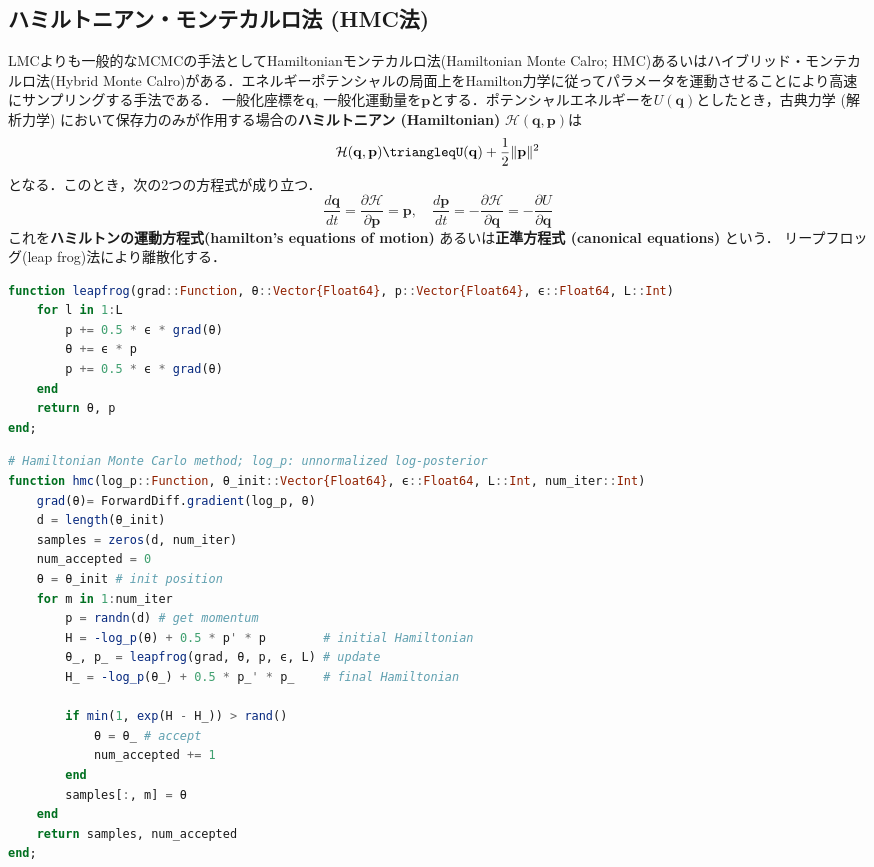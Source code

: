 \subsection{ハミルトニアン・モンテカルロ法 (HMC法)}
LMCよりも一般的なMCMCの手法としてHamiltonianモンテカルロ法(Hamiltonian Monte Calro; HMC)あるいはハイブリッド・モンテカルロ法(Hybrid Monte Calro)がある．エネルギーポテンシャルの局面上をHamilton力学に従ってパラメータを運動させることにより高速にサンプリングする手法である．
一般化座標を$\mathbf{q}$, 一般化運動量を$\mathbf{p}$とする．ポテンシャルエネルギーを$U(\mathbf{q})$としたとき，古典力学 (解析力学) において保存力のみが作用する場合の\textbf{ハミルトニアン (Hamiltonian)} $\mathcal{H}(\mathbf{q}, \mathbf{p})$は
\begin{equation}
\mathcal{H}(\mathbf{q}, \mathbf{p})\triangleqU(\mathbf{q})+\frac{1}{2}\|\mathbf{p}\|^2
\end{equation}
となる．このとき，次の2つの方程式が成り立つ．
\begin{equation}
\frac{d\mathbf{q}}{dt}=\frac{\partial \mathcal{H}}{\partial \mathbf{p}}=\mathbf{p},\quad\frac{d\mathbf{p}}{dt}=-\frac{\partial \mathcal{H}}{\partial \mathbf{q}}=-\frac{\partial U}{\partial \mathbf{q}}
\end{equation}
これを\textbf{ハミルトンの運動方程式(hamilton's equations of motion)} あるいは\textbf{正準方程式 (canonical equations)} という．
リープフロッグ(leap frog)法により離散化する．
\begin{lstlisting}[language=julia]
function leapfrog(grad::Function, θ::Vector{Float64}, p::Vector{Float64}, ϵ::Float64, L::Int)
    for l in 1:L
        p += 0.5 * ϵ * grad(θ)
        θ += ϵ * p
        p += 0.5 * ϵ * grad(θ)
    end
    return θ, p
end;
\end{lstlisting}
\begin{lstlisting}[language=julia]
# Hamiltonian Monte Carlo method; log_p: unnormalized log-posterior
function hmc(log_p::Function, θ_init::Vector{Float64}, ϵ::Float64, L::Int, num_iter::Int)
    grad(θ)= ForwardDiff.gradient(log_p, θ)
    d = length(θ_init)
    samples = zeros(d, num_iter)
    num_accepted = 0
    θ = θ_init # init position
    for m in 1:num_iter
        p = randn(d) # get momentum        
        H = -log_p(θ) + 0.5 * p' * p        # initial Hamiltonian
        θ_, p_ = leapfrog(grad, θ, p, ϵ, L) # update
        H_ = -log_p(θ_) + 0.5 * p_' * p_    # final Hamiltonian
        
        if min(1, exp(H - H_)) > rand()
            θ = θ_ # accept
            num_accepted += 1
        end
        samples[:, m] = θ
    end
    return samples, num_accepted
end;
\end{lstlisting}

